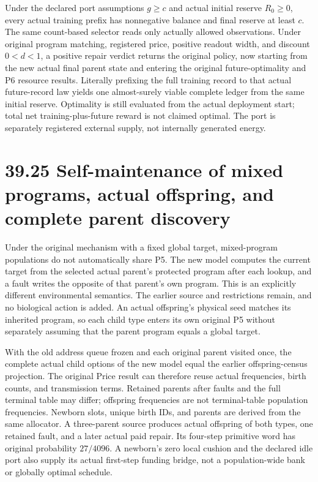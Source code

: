 \documentclass[
  english,
  11pt,
  oneside]{book}
\begin{document}
Under the declared port assumptions \(g\ge c\) and actual initial reserve \(R_0\ge0\), every actual training prefix has nonnegative balance and final reserve at least \(c\). The same count-based selector reads only actually allowed observations. Under original program matching, registered price, positive readout width, and discount \(0<d<1\), a positive repair verdict returns the original policy, now starting from the new actual final parent state and entering the original future-optimality and P6 resource results. Literally prefixing the full training record to that actual future-record law yields one almost-surely viable complete ledger from the same initial reserve. Optimality is still evaluated from the actual deployment start; total net training-plus-future reward is not claimed optimal. The port is separately registered external supply, not internally generated energy.

\section{39.25 Self-maintenance of mixed programs, actual offspring, and complete parent discovery}\label{self-maintenance-of-mixed-programs-actual-offspring-and-complete-parent-discovery}

Under the original mechanism with a fixed global target, mixed-program populations do not automatically share P5. The new model computes the current target from the selected actual parent's protected program after each lookup, and a fault writes the opposite of that parent's own program. This is an explicitly different environmental semantics. The earlier source and restrictions remain, and no biological action is added. An actual offspring's physical seed matches its inherited program, so each child type enters its own original P5 without separately assuming that the parent program equals a global target.

With the old address queue frozen and each original parent visited once, the complete actual child options of the new model equal the earlier offspring-census projection. The original Price result can therefore reuse actual frequencies, birth counts, and transmission terms. Retained parents after faults and the full terminal table may differ; offspring frequencies are not terminal-table population frequencies. Newborn slots, unique birth IDs, and parents are derived from the same allocator. A three-parent source produces actual offspring of both types, one retained fault, and a later actual paid repair. Its four-step primitive word has original probability \(27/4096\). A newborn's zero local cushion and the declared idle port also supply its actual first-step funding bridge, not a population-wide bank or globally optimal schedule.
\end{document}
